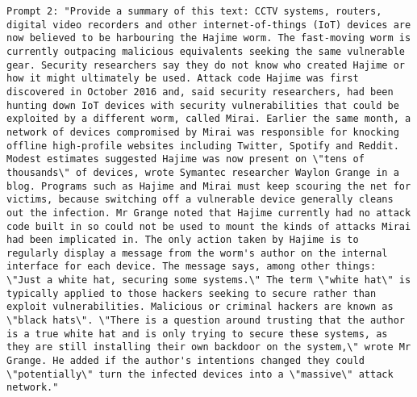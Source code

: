 \begin{lstlisting}[label=lst:judge_summar_instances,caption={Example of prompts for paraphrasing in English and French.}]
Prompt 2: "Provide a summary of this text: CCTV systems, routers, digital video recorders and other internet-of-things (IoT) devices are now believed to be harbouring the Hajime worm. The fast-moving worm is currently outpacing malicious equivalents seeking the same vulnerable gear. Security researchers say they do not know who created Hajime or how it might ultimately be used. Attack code Hajime was first discovered in October 2016 and, said security researchers, had been hunting down IoT devices with security vulnerabilities that could be exploited by a different worm, called Mirai. Earlier the same month, a network of devices compromised by Mirai was responsible for knocking offline high-profile websites including Twitter, Spotify and Reddit. Modest estimates suggested Hajime was now present on \"tens of thousands\" of devices, wrote Symantec researcher Waylon Grange in a blog. Programs such as Hajime and Mirai must keep scouring the net for victims, because switching off a vulnerable device generally cleans out the infection. Mr Grange noted that Hajime currently had no attack code built in so could not be used to mount the kinds of attacks Mirai had been implicated in. The only action taken by Hajime is to regularly display a message from the worm's author on the internal interface for each device. The message says, among other things: \"Just a white hat, securing some systems.\" The term \"white hat\" is typically applied to those hackers seeking to secure rather than exploit vulnerabilities. Malicious or criminal hackers are known as \"black hats\". \"There is a question around trusting that the author is a true white hat and is only trying to secure these systems, as they are still installing their own backdoor on the system,\" wrote Mr Grange. He added if the author's intentions changed they could \"potentially\" turn the infected devices into a \"massive\" attack network."

\end{lstlisting}
